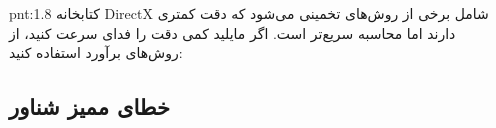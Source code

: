 {\begin{spacing}{1.5}
        \begin{point}{pnt:1.8}
            \Large
            کتابخانه DirectX شامل برخی از روش‌های تخمینی می‌شود که دقت کمتری دارند اما محاسبه سریع‌تر است.
            اگر مایلید کمی دقت را فدای سرعت کنید، از روش‌های برآورد استفاده کنید:
            \textbf{\vspace{6pt}}
            \lr{}
            \textbf{\vspace{-40pt}}
        \end{point}
    \end{spacing}
}

\subsection{\textbf{خطای ممیز شناور}}
\label{subsec:1.6.9}
